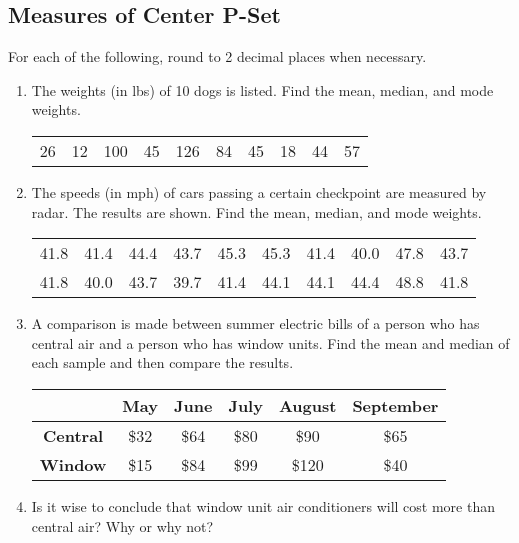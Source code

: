 \documentclass{article}
\begin{document}
\subsection*{Measures of Center P-Set}

For each of the following, round to 2 decimal places when necessary.

\begin{enumerate}
    \item The weights (in lbs) of 10 dogs is listed. Find the mean, median, and mode weights.
    \begin{center}
    \begin{tabular}{cccccccccc}
        26 & 12 & 100 & 45 & 126 & 84 & 45 & 18 & 44 & 57 \\
    \end{tabular}
    \end{center}
    
    \item The speeds (in mph) of cars passing a certain checkpoint are measured by radar. The results are shown. Find the mean, median, and mode weights.
    \begin{center}
    \begin{tabular}{cccccccccc}
        41.8 & 41.4 & 44.4 & 43.7 & 45.3 & 45.3 & 41.4 & 40.0 & 47.8 & 43.7 \\
        41.8 & 40.0 & 43.7 & 39.7 & 41.4 & 44.1 & 44.1 & 44.4 & 48.8 & 41.8
    \end{tabular}
    \end{center}
    
    \item A comparison is made between summer electric bills of a person who has central air and a person who has window units. Find the mean and median of each sample and then compare the results.
    \begin{center}
    \begin{tabular}{c|c|c|c|c|c}
         &  \textbf{May} & \textbf{June} & \textbf{July} & \textbf{August} & \textbf{September} \\ \hline
        \textbf{Central} & \$32 & \$64 & \$80 & \$90 & \$65 \\ \hline 
        \textbf{Window} & \$15 & \$84 & \$99 & \$120 & \$40 \\
    \end{tabular}
    \end{center}
    
    \item Is it wise to conclude that window unit air conditioners will cost more than central air? Why or why not?
    

\end{enumerate}
\end{document}
